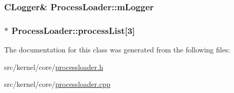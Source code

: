 \subsubsection[{\texorpdfstring{m\+Logger}{mLogger}}]{\setlength{\rightskip}{0pt plus 5cm}C\+Logger\& Process\+Loader\+::m\+Logger\hspace{0.3cm}{\ttfamily [protected]}}\hypertarget{classProcessLoader_a46ab766d18e7107c79aa47887013a6ac}{}\label{classProcessLoader_a46ab766d18e7107c79aa47887013a6ac}
\subsubsection[{\texorpdfstring{process\+List}{processList}}]{$\ast$ Process\+Loader\+::process\+List\mbox{[}3\mbox{]}}\hypertarget{classProcessLoader_a6189a22091af37309df381cade676d51}{}\label{classProcessLoader_a6189a22091af37309df381cade676d51}


The documentation for this class was generated from the following files\+:\begin{DoxyCompactItemize}
\item 
src/kernel/core/\hyperlink{processloader_8h}{processloader.\+h}\item 
src/kernel/core/\hyperlink{processloader_8cpp}{processloader.\+cpp}\end{DoxyCompactItemize}
